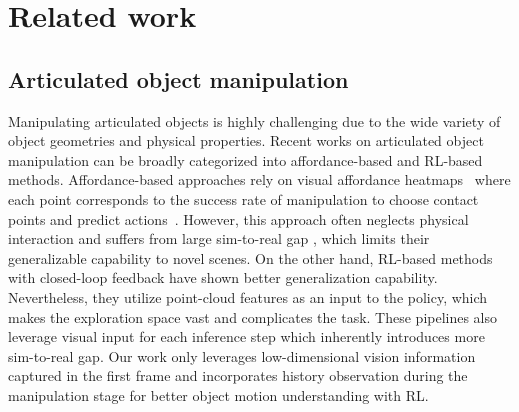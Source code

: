 \section{Related work}
\label{sec:relatedworks}
\subsection{Articulated object manipulation}
Manipulating articulated objects is highly challenging due to the wide variety of object geometries and physical properties. Recent works on articulated object manipulation can be broadly categorized into affordance-based and RL-based methods. Affordance-based approaches rely on visual affordance heatmaps~\cite{theory} where each point corresponds to the success rate of manipulation to choose contact points and predict actions~\cite{vatmart,where2act,umpnet,roboabc}.   However, this approach often neglects physical interaction and suffers from large sim-to-real gap \cite{where2act, where2explore, coarse}, which limits their generalizable capability to novel scenes. On the other hand, RL-based methods~\cite{partmanip,rlafford, li2024unidoormanip} with closed-loop feedback have shown better generalization capability. Nevertheless, they utilize point-cloud features as an input to the policy, which makes the exploration space vast and complicates the task. These pipelines also leverage visual input for each inference step which inherently introduces more sim-to-real gap. Our work only leverages low-dimensional vision information captured in the first frame and incorporates history observation during the manipulation stage for better object motion understanding with RL.
 

